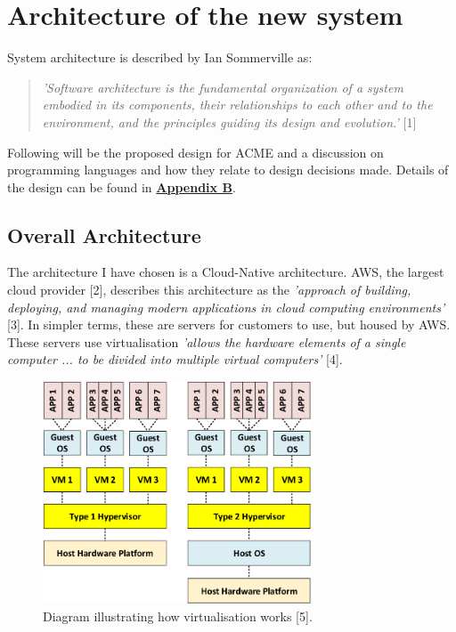 \section{Architecture of the new system}
  System architecture is described by Ian Sommerville as:
  \begin{quote}
    \textit{'Software architecture is the fundamental organization of a system embodied in its
    components, their relationships to each other and to the environment, and the principles
    guiding its design and evolution.'} [1]
  \end{quote}

  Following will be the proposed design for ACME and a discussion on programming languages and how they relate to design decisions made. 
  Details of the design can be found in \hyperref[sec:AppendixB]{\textbf{Appendix B}}.

  \subsection{Overall Architecture}
  The architecture I have chosen is a Cloud-Native architecture. AWS, the largest cloud provider [2], describes this architecture as the 
  \textit{'approach of building, deploying, and managing modern applications in cloud computing environments'} [3]. In simpler terms, these are 
  servers for customers to use, but housed by AWS. These servers use virtualisation \textit{'allows the hardware elements of a single computer ... 
  to be divided into multiple virtual computers'} [4]. 

  \begin{figure}[H]
    \centering
    \includegraphics[width=8cm]{assets/virtualisation.png}
    \caption{Diagram illustrating how virtualisation works [5].}
    \label{fig:virtualisation}
  \end{figure}

